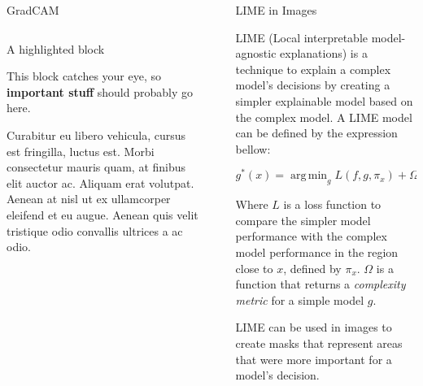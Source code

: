 \documentclass[final]{beamer}
\newlength{\sepwidth}
\newlength{\colwidth}
\newcommand{\separatorcolumn}{\begin{column}{\sepwidth}\end{column}}
\newcommand{\argmin}{\mathop{\mathrm{arg\,min}}}
\begin{document}
\begin{frame}[t]
\begin{columns}[t]
\begin{column}{\colwidth}
\begin{block}{GradCAM}
\begin{columns}
    \end{columns}
  \end{block}

  \begin{alertblock}{A highlighted block}

    This block catches your eye, so \textbf{important stuff} should probably go
    here.

    Curabitur eu libero vehicula, cursus est fringilla, luctus est. Morbi
    consectetur mauris quam, at finibus elit auctor ac. Aliquam erat volutpat.
    Aenean at nisl ut ex ullamcorper eleifend et eu augue. Aenean quis velit
    tristique odio convallis ultrices a ac odio.
  \end{alertblock}

\end{column}

\separatorcolumn

\begin{column}{\colwidth}

  \begin{block}{LIME in Images}

    LIME (Local interpretable model-agnostic explanations) is a technique to explain a complex model's decisions 
    by creating a simpler explainable model based on the complex model. A LIME model can be defined by the expression bellow:
    
    \[g^*(x) = \argmin_{g} L(f, g, \pi_x) + \Omega(g)\]
    
    Where \(L\) is a loss function to compare the simpler model performance with the complex model performance in the region close to \(x\), defined by \(\pi_x\). 
    \(\Omega\) is a function that returns a \textit{complexity metric} for a simple model \(g\).

    LIME can be used in images to create masks that represent areas that were more important for a model's decision.
    

\end{block}
\end{column}
\end{columns}
\end{frame}
\end{document}

